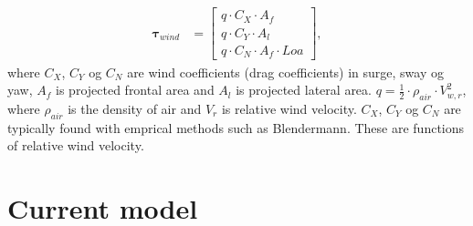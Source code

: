 \documentclass[a4paper]{article}
\begin{document}
\begin{equation}
\label{eq:vindkrefter}
\begin{aligned}
	\boldsymbol{\tau}_{wind} &=
		\left[ \begin{array}{ccc}
			q \cdot C_X \cdot  A_f \\
			q  \cdot C_Y \cdot A_l \\
			q  \cdot C_N \cdot A_f \cdot Loa
		\end{array} \right],
\end{aligned}
\end{equation}
%
where $C_X$, $C_Y$ og $C_N$ are wind coefficients (drag coefficients) in surge, sway og yaw, $A_f$ is projected frontal area and $A_l$ is projected lateral area.
$q = \frac{1}{2} \cdot \rho_{air} \cdot V_{w,r}^2$, where $\rho_{air}$ is the density of air and $V_r$ is relative wind velocity.
$C_X$, $C_Y$ og $C_N$ are typically found with emprical methods such as Blendermann. These are functions of relative wind velocity.

\section{Current model}
\end{document}
